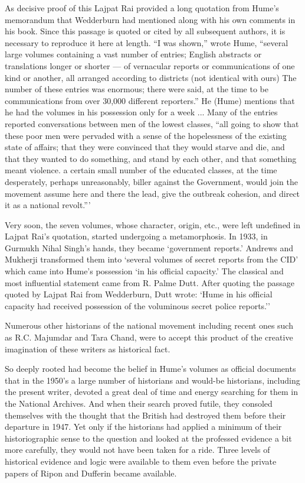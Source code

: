 \begin{multicols}{2}
As decisive proof of this Lajpat Rai provided a long quotation from Hume's memorandum that Wedderburn had mentioned along with his own comments in his book. Since this passage is quoted or cited by all subsequent authors, it is necessary to reproduce it here at length. ``I was shown,'' wrote Hume, ``several large volumes containing a vast number of entries; English abstracts or translations longer or shorter --- of vernacular reports or communications of one kind or another, all arranged according to districts (not identical with ours) The number of these entries was enormous; there were said, at the time to be communications from over 30,000 different reporters.'' He (Hume) mentions that he had the volumes in his possession only for a week ... Many of the entries reported conversations between men of the lowest classes, ``all going to show that these poor men were pervaded with a sense of the hopelessness of the existing state of affairs; that they were convinced that they would starve and die, and that they wanted to do something, and stand by each other, and that something meant violence. a certain small number of the educated classes, at the time desperately, perhaps unreasonably, biller against the Government, would join the movement assume here and there the lead, give the outbreak cohesion, and direct it as a national revolt.'''

Very soon, the seven volumes, whose character, origin, etc., were left undefined in Lajpat Rai's quotation, started undergoing a metamorphosis. In 1933, in Gurmukh Nihal Singh's hands, they became `government reports.' Andrews and Mukherji transformed them into `several volumes of secret reports from the CID' which came into Hume's possession `in his official capacity.' The classical and most influential statement came from R. Palme Dutt. After quoting the passage quoted by Lajpat Rai from Wedderburn, Dutt wrote: `Hume in his official capacity had received possession of the voluminous secret police reports.''

Numerous other historians of the national movement including recent ones such as R.C. Majumdar and Tara Chand, were to accept this product of the creative imagination of these writers as historical fact.

So deeply rooted had become the belief in Hume's volumes as official documents that in the 1950's a large number of historians and would-be historians, including the present writer, devoted a great deal of time and energy searching for them in the National Archives. And when their search proved futile, they consoled themselves with the thought that the British had destroyed them before their departure in 1947. Yet only if the historians had applied a minimum of their historiographic sense to the question and looked at the professed evidence a bit more carefully, they would not have been taken for a ride. Three levels of historical evidence and logic were available to them even before the private papers of Ripon and Dufferin became available.


\end{multicols}
